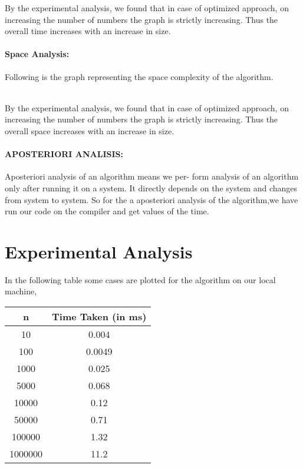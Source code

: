 \documentclass[10pt]{article}
\begin{document}
\begin{multicols*}{2}
By the experimental analysis, we found that in  case of optimized approach, on increasing the number of numbers the graph is strictly increasing. Thus the overall time increases with an increase in size.

\paragraph{Space Analysis:}Following is the graph representing the space complexity of the algorithm.\\\\

By the experimental analysis, we found that in case of optimized approach, on increasing the number of numbers the graph is strictly increasing. Thus the overall space increases with an increase in size.\\

\paragraph{APOSTERIORI ANALISIS:}
Aposteriori analysis of an algorithm means we per- form analysis of an algorithm only after running it on a system. It directly depends on the system and changes from system to system. So for the a aposteriori analysis of the algorithm,we have run our code on the compiler and get values of the time.

\section*{Experimental Analysis}
In the following table some cases are plotted for the algorithm on our local machine,
\begin{center}
 \begin{tabular}{||c | c||} 
 \hline
 n & Time Taken (in ms) \\ [0.5ex] 
 \hline\hline
 10 & 0.004 \\ 
 \hline
 100 & 0.0049 \\
 \hline
 1000 & 0.025 \\
 \hline
 5000 & 0.068 \\
 \hline
 10000 & 0.12 \\
 \hline
 50000 & 0.71 \\
 \hline
 100000 & 1.32 \\
 \hline
 1000000 & 11.2 \\ [1ex] 
 \hline
\end{tabular}
\end{center}


\end{multicols*}
\end{document}
